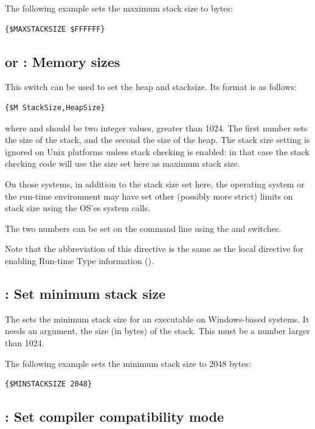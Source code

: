 The following example sets the maximum stack size to bytes:
\begin{verbatim}
{$MAXSTACKSIZE $FFFFFF}
\end{verbatim}

\subsection{ or  : Memory sizes}
\label{se:dirmemory}

This switch can be used to set the heap and stacksize. Its format is as
follows:
\begin{verbatim}
{$M StackSize,HeapSize}
\end{verbatim}
where  and  should be two integer values,
greater than 1024. The first number sets the size of the stack, and the
second the size of the heap. The stack size setting is ignored on Unix
platforms unless stack checking is enabled: in that case the
stack checking code will use the size set here as maximum stack size.

On those systems, in addition to the stack size set here, the operating
system or the run-time environment may have set other (possibly more strict) 
limits on stack size using the OS'es  system calls.

The two numbers can be set on the command line using the 
and  switches.

Note that the abbreviation of this directive is the same as the local
directive  for enabling Run-time Type information ().

\subsection{ : Set minimum stack size}
The  sets the minimum stack size for an executable
on Windows-based systems. It needs an argument, the size (in bytes) of the
stack. This must be a number larger than 1024.

The following example sets the minimum stack size to 2048 bytes:
\begin{verbatim}
{$MINSTACKSIZE 2048}
\end{verbatim}

\subsection{ : Set compiler compatibility mode}

